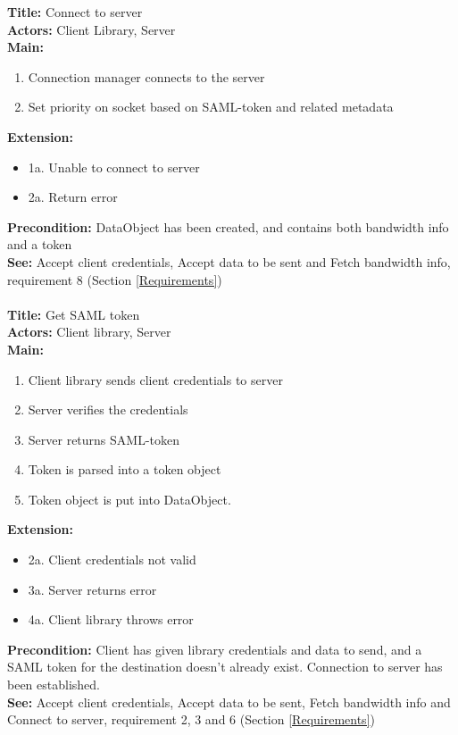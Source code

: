 		\textbf{Title:} Connect to server \\
		\textbf{Actors:} Client Library, Server \\
		\textbf{Main:}
		\begin{enumerate}	
			\item Connection manager connects to the server
			\item Set priority on socket based on SAML-token and related metadata
		\end{enumerate}
		\textbf{Extension:}
		\begin{itemize}
			  \item[] 1a. Unable to connect to server
			  \item[] 2a. Return error
		\end{itemize}
		\textbf{Precondition:} DataObject has been created, and contains both bandwidth info and a token \\
		\textbf{See:} Accept client credentials, Accept data to be sent and Fetch bandwidth info, requirement 8 (Section \ref{Requirements})
		\\\\
		\textbf{Title:} Get SAML token \\
		\textbf{Actors:} Client library, Server \\
		\textbf{Main:}
		\begin{enumerate}
			\item Client library sends client credentials to server
			\item Server verifies the credentials
			\item Server returns SAML-token
			\item Token is parsed into a token object
			\item Token object is put into DataObject.
		\end{enumerate}
		\textbf{Extension:}
		\begin{itemize}
	        \item[] 2a. Client credentials not valid
			\item[] 3a. Server returns error
			\item[] 4a. Client library throws error
		\end{itemize}
		\textbf{Precondition:} Client has given library credentials and data to send, and a SAML token for the destination doesn’t already exist. Connection to server has been established. \\
		\textbf{See:} Accept client credentials, Accept data to be sent, Fetch bandwidth info and Connect to server, requirement 2, 3 and 6 (Section \ref{Requirements})

